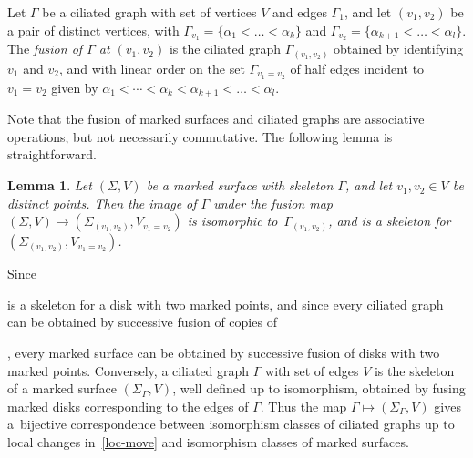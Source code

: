\documentclass[pdftex]{sigma}
\numberwithin{equation}{section}
\newtheorem{Lemma}[Theorem]{Lemma}
\begin{document}
Let $\Gamma$ be a ciliated graph with set of vertices $V$ and edges $\Gamma_1$, and let $(v_1, v_2)$ be a pair of distinct vertices, with $\Gamma_{v_1} = \{\alpha_1< \dots < \alpha_k\}$ and $\Gamma_{v_2} = \{\alpha_{k+1} < \dots < \alpha_l\}$. The {\it fusion of $\Gamma$ at $(v_1, v_2)$} is the ciliated graph $\Gamma_{(v_1, v_2)}$ obtained by identifying $v_1$ and $v_2$, and with linear order on the set $\Gamma_{v_1 = v_2}$ of half edges incident to $v_1 = v_2$ given by $\alpha_1 < \cdots < \alpha_k < \alpha_{k+1} < \dots < \alpha_l$.

Note that the fusion of marked surfaces and ciliated graphs are associative operations, but not necessarily commutative. The following lemma is straightforward.

\begin{Lemma} \label{fusion-graph-surf}
Let $(\Sigma, V)$ be a marked surface with skeleton $\Gamma$, and let $v_1, v_2 \in V$ be distinct points. Then the image of $\Gamma$ under the fusion map $(\Sigma, V) \to (\Sigma_{(v_1, v_2)}, V_{v_1 =v_2})$ is isomorphic to~$\Gamma_{(v_1, v_2)}$, and is a skeleton for $(\Sigma_{(v_1, v_2)}, V_{v_1= v_2})$.
\end{Lemma}

Since
is a skeleton for a disk with two marked points, and since every ciliated graph can be obtained by successive fusion of copies of
,
 every marked surface can be obtained by successive fusion of disks with two marked points. Conversely, a ciliated graph $\Gamma$ with set of edges $V$ is the skeleton of a marked surface $(\Sigma_\Gamma, V)$, well defined up to isomorphism, obtained by fusing marked disks corresponding to the edges of $\Gamma$. Thus the map $\Gamma \mapsto (\Sigma_\Gamma, V)$ gives a~bijective correspondence between isomorphism classes of ciliated graphs up to local changes in~\eqref{loc-move} and isomorphism classes of marked surfaces.
\end{document}
